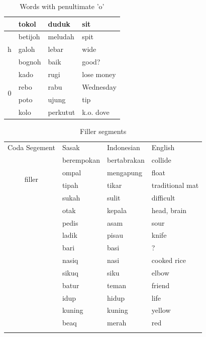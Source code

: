 \documentclass[12pt]{ouparticle}
\begin{document}
\begin{table}[]
\begin{tabular}{c|l l l}
                       & tokol & duduk & sit\\
    \hline
    \multirow{3}{*}{h} & betijoh & meludah & spit\\
                       & galoh & lebar & wide\\
                       & bognoh & baik & good?\\
    \hline
    \multirow{4}{*}{0} & kado & rugi & lose money\\
                       & rebo & rabu & Wednesday\\
                       & poto & ujung & tip\\
                       & kolo & perkutut & k.o. dove\\

    \end{tabular}
    \caption{Words with penultimate 'o'}
    \label{tab:my_label}
\end{table}

\begin{table}[]
    \centering
    \begin{tabular}{c|l l l}
    Coda Segement & Sasak & Indonesian & English  \\
    \multirow{4}{*}{filler} & berempokan & bertabrakan & collide\\
                       & ompal & mengapung & float\\
                       & tipah & tikar & traditional mat\\
                       & sukah & sulit   & difficult \\
                       & otak & kepala & head, brain\\
                       & pedis & asam & sour\\
                       & ladik & pisau & knife\\
                       & bari & basi & ?\\
                       & nasiq & nasi & cooked rice\\
                       & sikuq & siku & elbow\\
                       & batur & teman & friend\\
                       & idup & hidup & life\\
                       & kuning & kuning & yellow\\
                       & beaq   & merah & red\\
                       & 
    \end{tabular}
    \caption{Filler segments}
    \label{tab:my_label}
\end{table}
\end{document}
